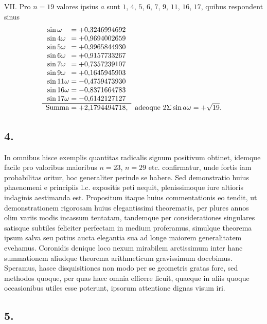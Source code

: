 \documentclass[twoside,12pt]{memoir}
\begin{document}
VII. Pro \(n=19\) valores ipsius \(a\) sunt \(1\), \(4\), \(5\), \(6\), \(7\), \(9\), \(11\), \(16\), \(17\), quibus respondent sinus
\[\begin{array}{rl}
 \sin \omega\phantom{11}=+0{,}3246994692 \phantom{,}&\\
 \sin 4 \omega\phantom{1}=+0{,}9694002659 \phantom{,}&\\
 \sin 5 \omega\phantom{1}=+0{,}9965844930 \phantom{,}&\\
\sin 6 \omega\phantom{1}=+0{,}9157733267 \phantom{,}&\\
 \sin 7 \omega\phantom{1}=+0{,}7357239107 \phantom{,}&\\
 \sin 9 \omega\phantom{1}=+0{,}1645945903 \phantom{,}&\\
 \sin 11 \omega=-0{,}4759473930 \phantom{,}&\\
 \sin 16 \omega=-0{,}8371664783 \phantom{,}&\\
 \sin 17 \omega=-0{,}6142127127 \phantom{,}&\\ 
 \cline{1-1} \text{Summa}=+2{,}1794494718,&\text{adeoque } 2 \Sigma \sin a \omega=+\sqrt{19}.
\end{array}\]\pagebreak%

\subsection*{4.}
 
In omnibus hisce exemplis quantitas radicalis signum positivum obtinet, idemque facile pro valoribus maioribus \(n=23\), \(n=29\) etc. confirmatur, unde fortis iam probabilitas oritur, hoc generaliter perinde se habere. Sed demonstratio huius phaenomeni e principiis l.c. expositis peti nequit, plenissimoque iure altioris indaginis aestimanda est. Propositum itaque huius commentationis eo tendit, ut demonstrationem rigorosam huius elegantissimi theorematis, per plures annos olim variis modis incassum tentatam, tandemque per considerationes singulares satisque subtiles feliciter perfectam in medium proferamus, simulque theorema ipsum salva seu potius aucta elegantia sua ad longe maiorem generalitatem evehamus. Coronidis denique loco nexum mirabilem arctissimum inter hanc summationem aliudque theorema arithmeticum gravissimum docebimus. Speramus, hasce disquisitiones non modo per se geometris gratas fore, sed methodos quoque, per quas haec omnia efficere licuit, quaeque in aliis quoque occasionibus utiles esse poterunt, ipsorum attentione dignas visum iri.

\subsection*{5.}
 
\end{document}
